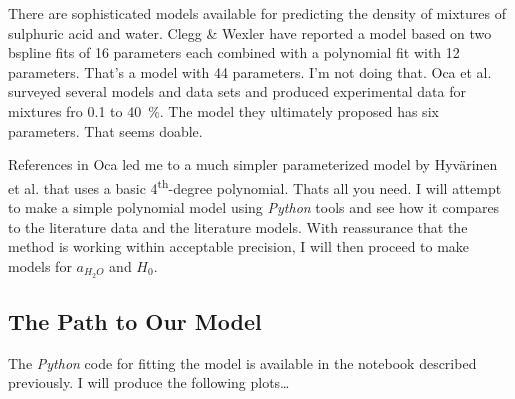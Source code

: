 \documentclass[]{tufte-handout}
\newcommand{\tss}[1]{\textsuperscript{#1}}
\begin{document}
There are sophisticated models available for predicting the density of mixtures of sulphuric acid and water. Clegg \& Wexler have reported a model based on two bspline fits of 16 parameters each combined with a polynomial fit with 12 parameters. That's a model with 44 parameters. I'm not doing that. Oca et al. surveyed several models and data sets and produced experimental data for  mixtures fro \num{0.1} to \qty{40}{\percent}. The model they ultimately proposed has six parameters. That seems doable. 




References in Oca led me to a much simpler parameterized model by Hyvärinen et al. that uses a basic 4\tss{th}-degree polynomial. Thats all you need. I will attempt to make a simple polynomial model using \textit{Python} tools and see how it compares to the literature data and the literature models. With reassurance that the method is working within acceptable precision, I will then proceed to make models for $a_{H_2O}$ and $H_0$.

\newpage
 \subsection{The Path to Our Model}
 
 The \textit{Python} code for fitting the model is available in the notebook described previously. I will produce the following plots\ldots
 
\end{document}
